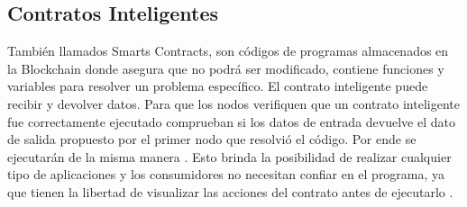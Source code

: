 \subsection{Contratos Inteligentes}
También llamados Smarts Contracts, son códigos de programas almacenados en la Blockchain
donde asegura que no podrá ser modificado, contiene funciones y variables
para resolver un problema específico. El contrato inteligente puede recibir y devolver datos. 
Para que los nodos verifiquen que un contrato inteligente fue correctamente ejecutado comprueban si los datos
de entrada devuelve el dato de salida propuesto por el primer nodo que resolvió el código.   
Por ende se ejecutarán de la misma manera \cite[]{Blockchain_federal_argentina_smart_2020,raskin_law_2017}.
Esto brinda la posibilidad de realizar cualquier tipo de aplicaciones y 
los consumidores no necesitan confiar en el programa, ya que tienen la libertad de visualizar las 
acciones del contrato antes de ejecutarlo \cite[]{Blockchain_federal_argentina_smart_2020}.